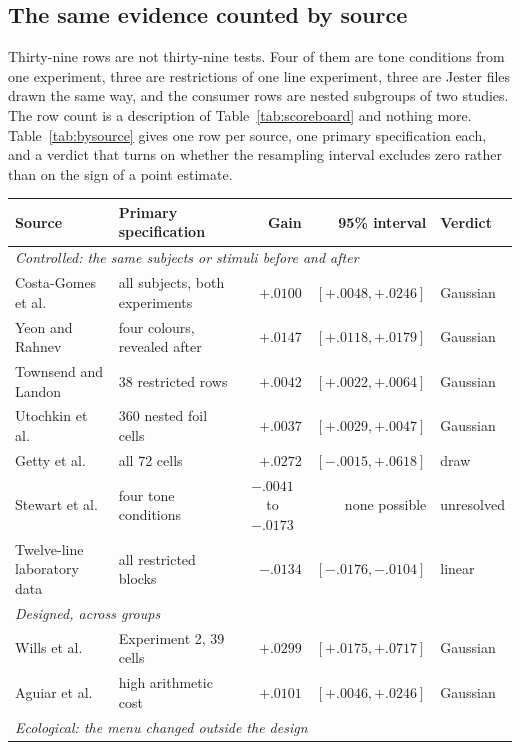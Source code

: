 \documentclass[11pt]{article}
\begin{document}
\subsection{The same evidence counted by source}
\label{sec:bysource}

Thirty-nine rows are not thirty-nine tests. Four of them are tone conditions from one
experiment, three are restrictions of one line experiment, three are Jester files drawn the same
way, and the consumer rows are nested subgroups of two studies. The row count is a description of
Table~\ref{tab:scoreboard} and nothing more. Table~\ref{tab:bysource} gives one row per source,
one primary specification each, and a verdict that turns on whether the resampling interval
excludes zero rather than on the sign of a point estimate.

\begin{table}[ht]
\centering
\footnotesize
\setlength{\tabcolsep}{4pt}
\begin{tabular}{llrrl}
\toprule
Source & Primary specification & Gain & 95\% interval & Verdict \\
\midrule
\multicolumn{5}{l}{\emph{Controlled: the same subjects or stimuli before and after}} \\
Costa-Gomes et al. & all subjects, both experiments & $+.0100$ & $[+.0048, +.0246]$ & Gaussian \\
Yeon and Rahnev & four colours, revealed after & $+.0147$ & $[+.0118, +.0179]$ & Gaussian \\
Townsend and Landon & 38 restricted rows & $+.0042$ & $[+.0022, +.0064]$ & Gaussian \\
Utochkin et al. & 360 nested foil cells & $+.0037$ & $[+.0029, +.0047]$ & Gaussian \\
Getty et al. & all 72 cells & $+.0272$ & $[-.0015, +.0618]$ & draw \\
Stewart et al. & four tone conditions & \multicolumn{1}{c}{$-.0041$ to $-.0173$} & none possible & unresolved \\
Twelve-line laboratory data & all restricted blocks & $-.0134$ & $[-.0176, -.0104]$ & linear \\
\midrule
\multicolumn{5}{l}{\emph{Designed, across groups}} \\
Wills et al. & Experiment 2, 39 cells & $+.0299$ & $[+.0175, +.0717]$ & Gaussian \\
Aguiar et al. & high arithmetic cost & $+.0101$ & $[+.0046, +.0246]$ & Gaussian\footnotemark[10] \\
\midrule
\multicolumn{5}{l}{\emph{Ecological: the menu changed outside the design}} \\

\end{tabular}
\end{table}
\end{document}

